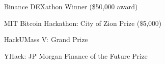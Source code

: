 
\begin{tightemize}
\item Binance DEXathon Winner (\$50,000 award)
\item MIT Bitcoin Hackathon: City of Zion Prize (\$5,000)
\item HackUMass V: Grand Prize
\item YHack: JP Morgan Finance of the Future Prize
\end{tightemize}